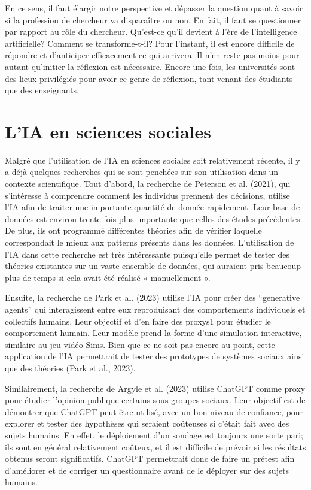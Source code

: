 \documentclass[
  letterpaper,
  DIV=11,
  numbers=noendperiod]{scrreprt}
\begin{document}
En ce sens, il faut élargir notre perspective et dépasser la question
quant à savoir si la profession de chercheur va disparaître ou non. En
fait, il faut se questionner par rapport au rôle du chercheur. Qu'est-ce
qu'il devient à l'ère de l'intelligence artificielle? Comment se
transforme-t-il? Pour l'instant, il est encore difficile de répondre et
d'anticiper efficacement ce qui arrivera. Il n'en reste pas moins pour
autant qu'initier la réflexion est nécessaire. Encore une fois, les
universités sont des lieux privilégiés pour avoir ce genre de réflexion,
tant venant des étudiants que des enseignants.

\hypertarget{lia-en-sciences-sociales}{%
\section{L'IA en sciences sociales}\label{lia-en-sciences-sociales}}

Malgré que l'utilisation de l'IA en sciences sociales soit relativement
récente, il y a déjà quelques recherches qui se sont penchées sur son
utilisation dans un contexte scientifique. Tout d'abord, la recherche de
Peterson et al. (2021), qui s'intéresse à comprendre comment les
individus prennent des décisions, utilise l'IA afin de traiter une
importante quantité de donnée rapidement. Leur base de données est
environ trente fois plus importante que celles des études précédentes.
De plus, ils ont programmé différentes théories afin de vérifier
laquelle correspondait le mieux aux patterns présents dans les données.
L'utilisation de l'IA dans cette recherche est très intéressante
puisqu'elle permet de tester des théories existantes sur un vaste
ensemble de données, qui auraient pris beaucoup plus de temps si cela
avait été réalisé « manuellement ».

Ensuite, la recherche de Park et al. (2023) utilise l'IA pour créer des
``generative agents'' qui interagissent entre eux reproduisant des
comportements individuels et collectifs humains. Leur objectif et d'en
faire des proxys1 pour étudier le comportement humain. Leur modèle prend
la forme d'une simulation interactive, similaire au jeu vidéo Sims. Bien
que ce ne soit pas encore au point, cette application de l'IA
permettrait de tester des prototypes de systèmes sociaux ainsi que des
théories (Park et al., 2023).

Similairement, la recherche de Argyle et al. (2023) utilise ChatGPT
comme proxy pour étudier l'opinion publique certains sous-groupes
sociaux. Leur objectif est de démontrer que ChatGPT peut être utilisé,
avec un bon niveau de confiance, pour explorer et tester des hypothèses
qui seraient coûteuses si c'était fait avec des sujets humains. En
effet, le déploiement d'un sondage est toujours une sorte pari; ils sont
en général relativement coûteux, et il est difficile de prévoir si les
résultats obtenus seront significatifs. ChatGPT permettrait donc de
faire un prétest afin d'améliorer et de corriger un questionnaire avant
de le déployer sur des sujets humains.
\end{document}
